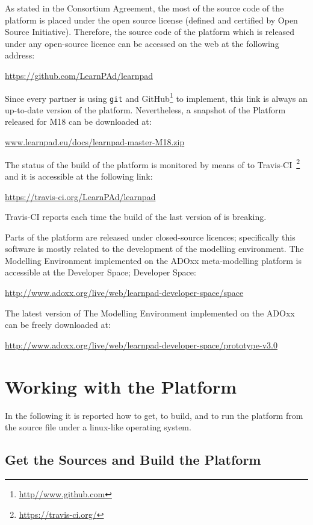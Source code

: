 \documentclass{learnpad}
\begin{document}
As stated in the Consortium Agreement, the most of the source code of the 
platform is placed under the open source license (defined and certified by Open 
Source Initiative). Therefore, the source code of the \learnpad platform which 
is released under any open-source licence can be accessed on the web at the 
following address:

\url{https://github.com/LearnPAd/learnpad}

Since every partner is using \texttt{git} and 
GitHub\footnote{\url{http//www.github.com}} to implement, this link is
always an up-to-date version of the \learnpad platform.
Nevertheless, a snapshot of the \learnpad Platform released for M18 
can be downloaded at:

\url{www.learnpad.eu/docs/learnpad-master-M18.zip}

The status of the build of the platform is monitored by means of to 
Travis-CI~\footnote{\url{https://travis-ci.org/}} and it is accessible at the 
following link:

\url{https://travis-ci.org/LearnPAd/learnpad}

Travis-CI reports each time the build of the last version of \learnpad is
breaking.

Parts of the \learnpad platform are released under closed-source licences; 
specifically this software is mostly related to the development of the modelling 
environment. The \learnpad Modelling Environment implemented on the ADOxx 
meta-modelling platform is accessible at the \learnpad Developer Space;
\learnpad Developer Space:
 
\url{http://www.adoxx.org/live/web/learnpad-developer-space/space}

The latest version of  The \learnpad Modelling Environment implemented on the 
ADOxx  can be freely downloaded at:

\url{http://www.adoxx.org/live/web/learnpad-developer-space/prototype-v3.0}

\chapter{Working with the \learnpad Platform}
\label{ch:platform}

In the following it is reported how to get, to build, and to
run the \learnpad platform from the source file under a linux-like
operating system.

\section{Get the Sources and Build the Platform}
\label{sec:build}
\end{document}
